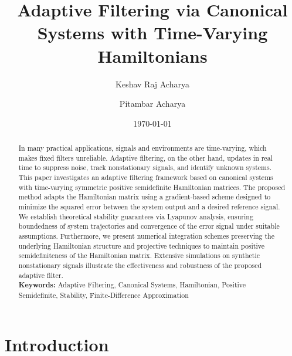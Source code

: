\documentclass[reqno]{amsart}
\title{Adaptive Filtering via Canonical Systems with Time-Varying  Hamiltonians}
\author[Acharya]{Keshav Raj Acharya}
\author[Acharya]{Pitambar Acharya}
\date{\today}
\numberwithin{equation}{section}
\begin{document}
\maketitle

\begin{abstract}
In many practical applications, signals and environments are time-varying, which makes fixed filters unreliable. Adaptive filtering, on the other hand, updates in real time to suppress noise, track nonstationary signals, and identify unknown systems. This paper investigates an adaptive filtering framework based on canonical systems with time-varying symmetric positive semidefinite Hamiltonian matrices.  The proposed method adapts the Hamiltonian matrix using a gradient-based scheme designed to minimize the squared error between the system output and a desired reference signal. We establish theoretical stability guarantees via Lyapunov analysis, ensuring boundedness of system trajectories and convergence of the error signal under suitable assumptions. Furthermore, we present numerical integration schemes preserving the underlying Hamiltonian structure and projective techniques to maintain positive semidefiniteness of the Hamiltonian matrix. Extensive simulations on synthetic nonstationary signals illustrate the effectiveness and robustness of the proposed adaptive filter.\\

\textbf{Keywords:} Adaptive Filtering, Canonical Systems,  Hamiltonian, Positive Semidefinite, Stability, Finite-Difference Approximation 

\end{abstract}

\section{Introduction}
\end{document}
